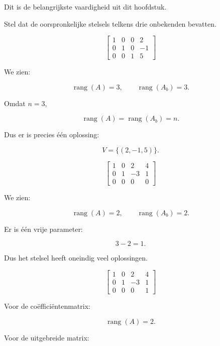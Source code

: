 \documentclass{ximera}
\begin{document}


Dit is de belangrijkste vaardigheid uit dit hoofdstuk.

Stel dat de oorspronkelijke stelsels telkens drie onbekenden bevatten.



\[
\left[
\begin{array}{ccc|c}
1&0&0&2\\
0&1&0&-1\\
0&0&1&5
\end{array}
\right]
\]

We zien:

\[
\operatorname{rang}(A)=3,
\qquad
\operatorname{rang}(A_b)=3.
\]

Omdat \(n=3\),

\[
\operatorname{rang}(A)=\operatorname{rang}(A_b)=n.
\]

Dus er is precies één oplossing:

\[
V=\{(2,-1,5)\}.
\]



\[
\left[
\begin{array}{ccc|c}
1&0&2&4\\
0&1&-3&1\\
0&0&0&0
\end{array}
\right]
\]

We zien:

\[
\operatorname{rang}(A)=2,
\qquad
\operatorname{rang}(A_b)=2.
\]

Er is één vrije parameter:

\[
3-2=1.
\]

Dus het stelsel heeft oneindig veel oplossingen.



\[
\left[
\begin{array}{ccc|c}
1&0&2&4\\
0&1&-3&1\\
0&0&0&1
\end{array}
\right]
\]

Voor de coëfficiëntenmatrix:

\[
\operatorname{rang}(A)=2.
\]

Voor de uitgebreide matrix:
\end{document}
